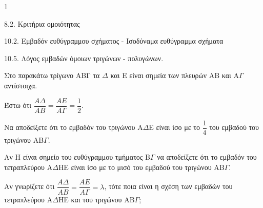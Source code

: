 \begin{ylh}{1}
    \item 8.2. Κριτήρια ομοιότητας
    \item 10.2. Εμβαδόν ευθύγραμμου σχήματος - Ισοδύναμα ευθύγραμμα σχήματα
    \item 10.5. Λόγος εμβαδών όμοιων τριγώνων - πολυγώνων.
\end{ylh}
\begin{figure} %
\end{figure}

Στο παρακάτω τρίγωνο ΑΒΓ τα $\Delta$ και E είναι σημεία των πλευρών AB και A$\Gamma$ αντίστοιχα.
\begin{alist}
    \item Έστω ότι $\dfrac{A\Delta}{AB} = \dfrac{AE}{A\Gamma} = \dfrac{1}{2}$.
    \begin{rlist}
        \item Να αποδείξετε ότι το εμβαδόν του τριγώνου A$\Delta$E είναι ίσο με το $\dfrac{1}{4}$ του εμβαδού του τριγώνου AB$\Gamma$. 
        \item Αν H είναι σημείο του ευθύγραμμου τμήματος B$\Gamma$ να αποδείξετε ότι το εμβαδόν του τετραπλεύρου A$\Delta$HE είναι ίσο με το μισό του εμβαδού του τριγώνου AB$\Gamma$. 
    \end{rlist}
    \item Αν γνωρίζετε ότι $\dfrac{A\Delta}{AB} = \dfrac{AE}{A\Gamma} = \lambda$, τότε ποια είναι η σχέση των εμβαδών του τετραπλεύρου A$\Delta$HE και του τριγώνου AB$\Gamma$; 
\end{alist}